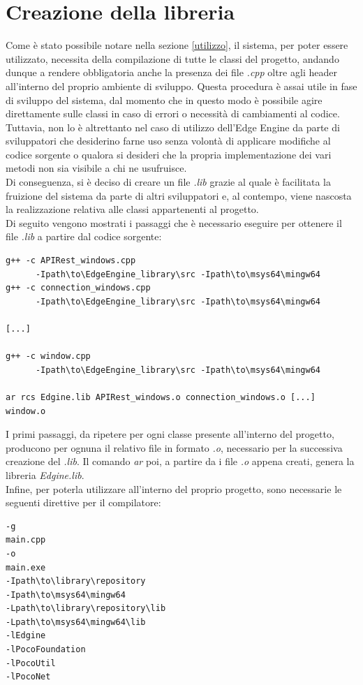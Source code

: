 \section{Creazione della libreria}
Come è stato possibile notare nella sezione \ref{utilizzo}, il sistema, per poter essere utilizzato, necessita della compilazione di tutte le classi del progetto, andando dunque a rendere obbligatoria anche la presenza dei file \textit{.cpp} oltre agli header all'interno del proprio ambiente di sviluppo. Questa procedura è assai utile in fase di sviluppo del sistema, dal momento che in questo modo è possibile agire direttamente sulle classi in caso di errori o necessità di cambiamenti al codice. Tuttavia, non lo è altrettanto nel caso di utilizzo dell'Edge Engine da parte di sviluppatori che desiderino farne uso senza volontà di applicare modifiche al codice sorgente o qualora si desideri che la propria implementazione dei vari metodi non sia visibile a chi ne usufruisce.\\
Di conseguenza, si è deciso di creare un file \textit{.lib} grazie al quale è facilitata la fruizione del sistema da parte di altri sviluppatori e, al contempo, viene nascosta la realizzazione relativa alle classi appartenenti al progetto.\\
Di seguito vengono mostrati i passaggi che è necessario eseguire per ottenere il file \textit{.lib} a partire dal codice sorgente:
\begin{verbatim}
g++ -c APIRest_windows.cpp 
      -Ipath\to\EdgeEngine_library\src -Ipath\to\msys64\mingw64 
g++ -c connection_windows.cpp 
      -Ipath\to\EdgeEngine_library\src -Ipath\to\msys64\mingw64 

[...]

g++ -c window.cpp
      -Ipath\to\EdgeEngine_library\src -Ipath\to\msys64\mingw64 
 
ar rcs Edgine.lib APIRest_windows.o connection_windows.o [...] window.o
\end{verbatim}
I primi passaggi, da ripetere per ogni classe presente all'interno del progetto, producono per ognuna il relativo file in formato \textit{.o}, necessario per la successiva creazione del \textit{.lib}. Il comando \textit{ar} poi, a partire da i file \textit{.o} appena creati, genera la libreria \textit{Edgine.lib}.\\
Infine, per poterla utilizzare all'interno del proprio progetto, sono necessarie le seguenti direttive per il compilatore:
\begin{verbatim}
-g
main.cpp
-o
main.exe
-Ipath\to\library\repository
-Ipath\to\msys64\mingw64
-Lpath\to\library\repository\lib
-Lpath\to\msys64\mingw64\lib
-lEdgine
-lPocoFoundation
-lPocoUtil
-lPocoNet
\end{verbatim}








